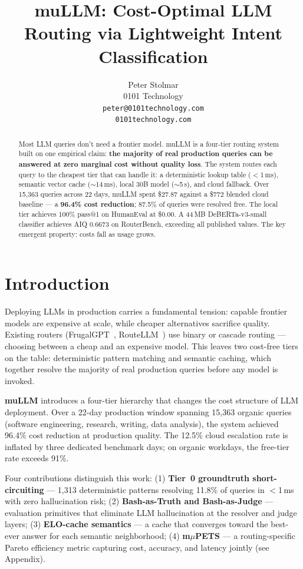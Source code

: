 \documentclass[11pt]{article}
\title{muLLM: Cost-Optimal LLM Routing via Lightweight Intent Classification}
\author{Peter Stolmar \\
  0101 Technology \\
  \texttt{peter@0101technology.com} \\
  \texttt{0101technology.com}}
\begin{document}
\maketitle

\begin{abstract}
Most LLM queries don't need a frontier model. muLLM is a four-tier
routing system built on one empirical claim: \textbf{the majority of
real production queries can be answered at zero marginal cost without
quality loss}. The system routes each query to the cheapest tier that
can handle it: a deterministic lookup table ($<$1\,ms), semantic vector
cache ($\sim$14\,ms), local 30B model ($\sim$5\,s), and cloud fallback.
Over 15,363 queries across 22 days, muLLM spent \$27.87 against a \$772
blended cloud baseline --- a \textbf{96.4\% cost reduction}; 87.5\% of
queries were resolved free. The local tier achieves 100\% pass@1 on
HumanEval at \$0.00. A 44\,MB DeBERTa-v3-small classifier achieves AIQ
0.6673 on RouterBench, exceeding all published values. The key emergent
property: costs fall as usage grows.
\end{abstract}

\section{Introduction}

Deploying LLMs in production carries a fundamental tension: capable
frontier models are expensive at scale, while cheaper alternatives
sacrifice quality. Existing routers
(FrugalGPT~\cite{chen2023frugalgpt}, RouteLLM~\cite{ong2024routellm})
use binary or cascade routing --- choosing between a cheap and an
expensive model. This leaves two cost-free tiers on the table:
deterministic pattern matching and semantic caching, which together
resolve the majority of real production queries before any model is
invoked.

\textbf{muLLM} introduces a four-tier hierarchy that changes the cost
structure of LLM deployment. Over a 22-day production window spanning
15,363 organic queries (software engineering, research, writing, data
analysis), the system achieved 96.4\% cost reduction at production
quality. The 12.5\% cloud escalation rate is inflated by three
dedicated benchmark days; on organic workdays, the free-tier rate
exceeds 91\%.

Four contributions distinguish this work: (1) \textbf{Tier~0 groundtruth
short-circuiting} --- 1,313 deterministic patterns resolving 11.8\% of
queries in $<$1\,ms with zero hallucination risk; (2) \textbf{Bash-as-Truth
and Bash-as-Judge} --- evaluation primitives that eliminate LLM
hallucination at the resolver and judge layers; (3) \textbf{ELO-cache
semantics} --- a cache that converges toward the best-ever answer for
each semantic neighborhood; (4) \textbf{m$\mu$PETS} --- a routing-specific
Pareto efficiency metric capturing cost, accuracy, and latency jointly
(see Appendix).
\end{document}
